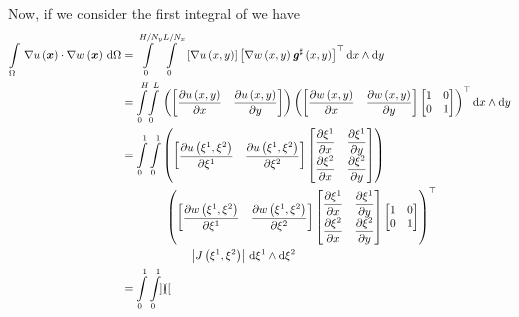 Now, if we consider the first integral of  we have
\begin{equation}
  \begin{aligned}
    \gint{\Omega}{}{\dotprod{\gradient{}{\fnof{u}{\vectr{x}}}}{\gradient{}{\fnof{w}{\vectr{x}}}}}{\Omega}&=
    \giint{0}{H/N_{y}}{0}{L/N_{x}}{\sqbrac{\gradient{}{\fnof{u}{x,y}}}
      \transpose{\sqbrac{\gradient{}{\fnof{w}{x,y}}\fnof{\sharptensor{\generalmetrictensor}}{x,y}}}}{x}{y}\\
    &=\giint{0}{H}{0}{L}{\pbrac{\begin{bmatrix}\delby{\fnof{u}{x,y}}{x}&\delby{\fnof{u}{x,y}}{y}\end{bmatrix}}
      \transpose{\pbrac{\begin{bmatrix}\delby{\fnof{w}{x,y}}{x}&\delby{\fnof{w}{x,y}}{y}\end{bmatrix}\begin{bmatrix}
            1 & 0 \\
            0 & 1
    \end{bmatrix}}}}{x}{y} \\
    &=\dintl{0}{1}\dintl{0}{1}\pbrac{\begin{bmatrix}
        \delby{\fnof{u}{\xione,\xitwo}}{\xione}&\delby{\fnof{u}{\xione,\xitwo}}{\xitwo}
      \end{bmatrix}\begin{bmatrix}
      \delby{\xione}{x} & \delby{\xione}{y} \\
      \delby{\xitwo}{x} & \delby{\xitwo}{y}
    \end{bmatrix}} \\
    &\qquad\qquad\transpose{\pbrac{\begin{bmatrix}
          \delby{\fnof{w}{\xione,\xitwo}}{\xione}&\delby{\fnof{w}{\xione,\xitwo}}{\xitwo}
        \end{bmatrix}\begin{bmatrix}
          \delby{\xione}{x} & \delby{\xione}{y} \\
          \delby{\xitwo}{x} & \delby{\xitwo}{y}
        \end{bmatrix}\begin{bmatrix}
          1 & 0 \\
          0 & 1
    \end{bmatrix}}} \\
    &\qquad\qquad\qquad\abs{\fnof{J}{\xione,\xitwo}}\infinitesimaltwo{\xione}{\xitwo} \\ 
    &=\dintl{0}{1}\dintl{0}{1}\pbrac{\begin{bmatrix}

\end{bmatrix}}
\end{aligned}
\end{equation}

